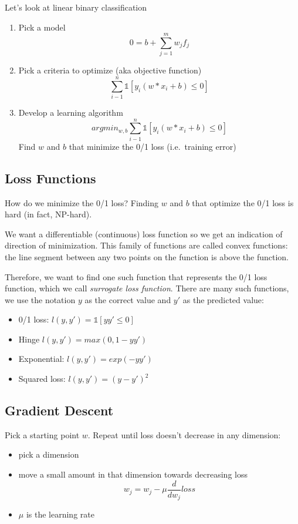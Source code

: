 \documentclass[11pt]{article}
\begin{document}
Let's look at linear binary classification

\begin{enumerate}
\def\labelenumi{\arabic{enumi}.}
\tightlist
\item
  Pick a model \[0 = b + \sum_{j=1}^{m}w_jf_j\]
\item
  Pick a criteria to optimize (aka objective function)
  \[\sum_{i-1}^{n}\mathbb{1}[y_i(w*x_i+b) \le 0]\]
\item
  Develop a learning algorithm
  \[argmin_{w, b}\sum_{i-1}^{n}\mathbb{1}[y_i(w*x_i+b) \le 0]\] Find
  \(w\) and \(b\) that minimize the 0/1 loss (i.e.~training error)
\end{enumerate}

\subsection{Loss Functions}\label{loss-functions}

How do we minimize the 0/1 loss? Finding \(w\) and \(b\) that optimize
the 0/1 loss is hard (in fact, NP-hard).

We want a differentiable (continuous) loss function so we get an
indication of direction of minimization. This family of functions are
called convex functions: the line segment between any two points on the
function is above the function.

Therefore, we want to find one such function that represents the 0/1
loss function, which we call \emph{surrogate loss function}. There are
many such functions, we use the notation \(y\) as the correct value and
\(y'\) as the predicted value:

\begin{itemize}
\tightlist
\item
  0/1 loss: \(l(y, y')=\mathbb{1}[yy' \le 0]\)
\item
  Hinge \(l(y, y')= max(0,1-yy')\)
\item
  Exponential: \(l(y, y') = exp(-yy')\)
\item
  Squared loss: \(l(y, y') = (y -y')^2\)
\end{itemize}

\subsection{Gradient Descent}\label{gradient-descent-1}

Pick a starting point \(w\). Repeat until loss doesn't decrease in any
dimension:

\begin{itemize}
\tightlist
\item
  pick a dimension
\item
  move a small amount in that dimension towards decreasing loss
  \[w_j = w_j - \mu \frac{d}{dw_j}loss\]
\item
  \(\mu\) is the learning rate
\end{itemize}
\end{document}
